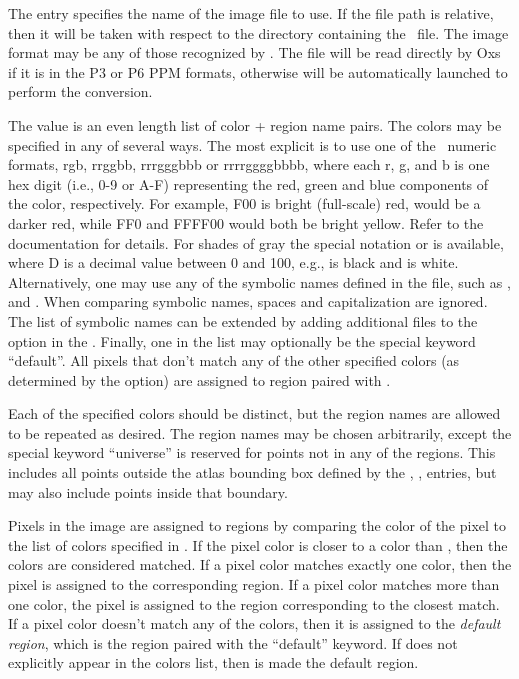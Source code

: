 \begin{description}
The  entry specifies the name of the image file to use.
If the file path is relative, then it will be taken with respect to the
directory containing the \MIF\ file.  The image format may be any of
those recognized by .  The file will be read directly by Oxs if it is
in the P3 or P6 PPM formats, otherwise  will be
automatically launched to perform the conversion.

The  value is an even length list of color + region
name pairs.  The colors may be specified in any of several ways.  The
most explicit is to use one of the \Tk\ numeric formats,
\lb rgb, \lb rrggbb, \lb rrrgggbbb or \lb rrrrggggbbbb, where
each r, g, and b is one hex digit (i.e., 0-9 or A-F) representing the
red, green and blue components of the color, respectively.  For example,
\lb F00 is bright (full-scale) red,  would be a darker red, while
\lb FF0 and \lb FFFF00 would both be bright yellow.  Refer to the
 documentation for details.  For shades of gray the
special notation  or  is available, where D is a
decimal value between 0 and 100, e.g.,  is black and
 is white.  Alternatively, one may use any of the symbolic
names defined in the  file, such as
,  and .  When comparing symbolic names,
spaces and capitalization are ignored.  The list of symbolic names can
be extended by adding additional files to the  option
in the  .  Finally, one  in the
 list may optionally be the special keyword ``default''.
All pixels that don't match any of the other specified colors (as
determined by the  option) are assigned to region
paired with .

Each of the specified colors should be distinct, but the region names
are allowed to be repeated as desired.  The region names may be chosen
arbitrarily, except the special keyword ``universe'' is reserved for
points not in any of the regions.  This includes all points outside the
atlas bounding box defined by the , , 
entries, but may also include points inside that boundary.

Pixels in the image are assigned to regions by comparing the color of
the pixel to the list of colors specified in .  If the
pixel color is closer to a  color than
, then the colors are considered matched.
If a pixel color matches exactly one  color, then the pixel
is assigned to the corresponding region.  If a pixel color matches more
than one  color, the pixel is assigned to the region
corresponding to the closest match.  If a pixel color doesn't match any
of the  colors, then it is assigned to the \textit{default
region}, which is the region paired with the ``default'' keyword.  If
 does not explicitly appear in the  colors
list, then  is made the default region.


\end{description}
